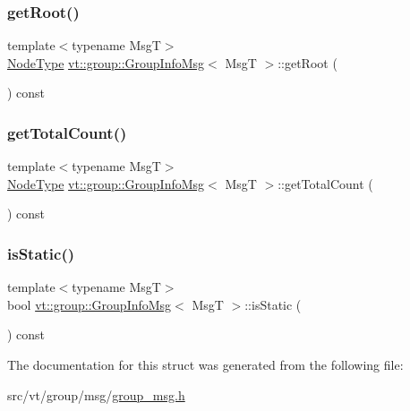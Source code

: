 \subsubsection{\texorpdfstring{get\+Root()}{getRoot()}}
{\footnotesize\ttfamily template$<$typename MsgT$>$ \\
\hyperlink{namespacevt_a866da9d0efc19c0a1ce79e9e492f47e2}{Node\+Type} \hyperlink{structvt_1_1group_1_1_group_info_msg}{vt\+::group\+::\+Group\+Info\+Msg}$<$ MsgT $>$\+::get\+Root (\begin{DoxyParamCaption}{ }\end{DoxyParamCaption}) const\hspace{0.3cm}{\ttfamily [inline]}}

\mbox{\label{structvt_1_1group_1_1_group_info_msg_ae344bd8126dfc617429cb4f887be7d34}} 
\subsubsection{\texorpdfstring{get\+Total\+Count()}{getTotalCount()}}
{\footnotesize\ttfamily template$<$typename MsgT$>$ \\
\hyperlink{namespacevt_a866da9d0efc19c0a1ce79e9e492f47e2}{Node\+Type} \hyperlink{structvt_1_1group_1_1_group_info_msg}{vt\+::group\+::\+Group\+Info\+Msg}$<$ MsgT $>$\+::get\+Total\+Count (\begin{DoxyParamCaption}{ }\end{DoxyParamCaption}) const\hspace{0.3cm}{\ttfamily [inline]}}

\mbox{\label{structvt_1_1group_1_1_group_info_msg_a9b59ffc275041b6a04c4aa61f10b4f79}} 
\subsubsection{\texorpdfstring{is\+Static()}{isStatic()}}
{\footnotesize\ttfamily template$<$typename MsgT$>$ \\
bool \hyperlink{structvt_1_1group_1_1_group_info_msg}{vt\+::group\+::\+Group\+Info\+Msg}$<$ MsgT $>$\+::is\+Static (\begin{DoxyParamCaption}{ }\end{DoxyParamCaption}) const\hspace{0.3cm}{\ttfamily [inline]}}



The documentation for this struct was generated from the following file\+:\begin{DoxyCompactItemize}
\item 
src/vt/group/msg/\hyperlink{group__msg_8h}{group\+\_\+msg.\+h}\end{DoxyCompactItemize}
